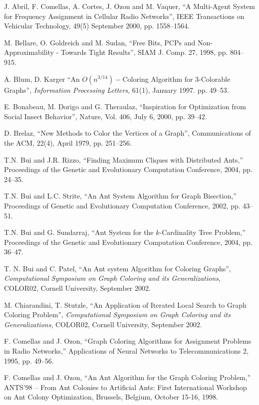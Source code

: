 \documentclass[11pt]{article}
\begin{document}
\begin{thebibliography}{99} 

J. Abril, F. Comellas, A. Cortes, J. Ozon and M. Vaquer,
``A Multi-Agent System for Frequency Assignment in Cellular Radio
Networks'',
IEEE Transactions on Vehicular Technology,  49(5) September 2000, pp.
1558--1564.


M. Bellare, O. Goldreich and M. Sudan,
``Free Bits, PCPs and Non-Approximability - Towards Tight Results'',
SIAM J. Comp. 27, 1998, pp. 804--915.

A. Blum, D. Karger
``An $O(n^{3/14})-$Coloring Algorithm for 3-Colorable Graphs'',
{\it Information Processing Letters}, 61(1), January 1997. pp. 49--53.

E. Bonabeau, M. Dorigo and G. Theraulaz,
``Inspiration for Optimization from Social Insect Behavior'',
Nature, Vol. 406, July 6, 2000, pp. 39--42.


D. Brelaz,
``New Methods to Color the Vertices of a Graph'',
Communications of the ACM, 22(4),  April 1979, pp. 251--256.


T.N. Bui and J.R. Rizzo, ``Finding Maximum Cliques with Distributed Ants,'' Proceedings of the Genetic and Evolutionary Computation Conference, 2004, pp. 24--35.

T.N. Bui and L.C. Strite, ``An Ant System Algorithm for Graph Bisection,'' Proceedings of  Genetic and Evolutionary Computation Conference, 2002, pp. 43--51.

T.N. Bui  and G. Sundarraj,  ``Ant System for the $k$-Cardinality Tree Problem,'' Proceedings of the Genetic and Evolutionary Computation Conference, 2004, pp. 36--47.

T. N. Bui and C. Patel,
``An Ant system Algorithm for Coloring Graphs'',
{\it Computational Symposium on Graph Coloring and its Generalizations}, 
COLOR02,
Cornell University, September 2002.

M. Chiarandini, T. Stutzle,
``An Application of Iterated Local Search to Graph Coloring Problem'',
{\it Computational Symposium on Graph Coloring and its Generalizations}, 
COLOR02,
Cornell University, September 2002.


F. Comellas and J. Ozon,
``Graph Coloring Algorithms for Assignment Problems in Radio Networks,''
Applications of Neural Networks to Telecommunications 2, 1995, pp.
49--56.


F. Comellas and J. Ozon,
``An Ant Algorithm for the Graph Coloring Problem,''
ANTS'98 -- From Ant Colonies to Artificial Ants: First International 
Workshop on Ant Colony Optimization, Brussels, Belgium, October 15-16, 1998.


\end{thebibliography}
\end{document}

